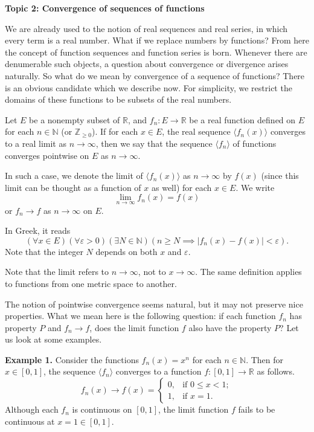\documentclass[11pt]{article}
\begin{document}
\begin{center}
  \textbf{Topic 2: Convergence of sequences of functions}
\end{center}

We are already used to the notion of real sequences and real series, in which every term is a real number.
What if we replace numbers by functions?
From here the concept of function sequences and function series is born.
Whenever there are denumerable such objects, a question about convergence or divergence arises naturally.
So what do we mean by convergence of a sequence of functions?
There is an obvious candidate which we describe now.
For simplicity, we restrict the domains of these functions to be subsets of the real numbers.

\begin{defn}
  Let $E$ be a nonempty subset of $\mathbb{R}$, and $f_n : E \to \mathbb{R}$ be a real function defined on $E$ for each $n \in \mathbb{N}$ (or $\mathbb{Z}_{\geqslant 0}$).
  If for each $x \in E$, the real sequence $\langle f_n(x)\rangle$ converges to a real limit as $n \to \infty$, then we say that the sequence $\langle f_n \rangle$ of functions \textsf{converges pointwise} on $E$ as $n \to \infty$.

  In such a case, we denote the limit of $\langle f_n(x) \rangle$ as $n \to \infty$ by $f(x)$ (since this limit can be thought as a function of $x$ as well) for each $x \in E$.  We write
  \[
    \lim_{n\to\infty} f_n(x) = f(x)
  \]
  or $f_n \rightarrow f$ as $n \to \infty$ on $E$.
\end{defn}

In Greek, it reads
\[
  (\forall x \in E)(\forall \varepsilon > 0)(\exists N \in \mathbb{N})(n \geqslant N \implies |f_n(x) - f(x)| < \varepsilon).
\]
Note that the integer $N$ depends on both $x$ and $\varepsilon$.

Note that the limit refers to $n \to \infty$, not to $x \to \infty$.
The same definition applies to functions from one metric space to another.

The notion of pointwise convergence seems natural, but it may not preserve nice properties.
What we mean here is the following question: if each function $f_n$ has property $P$ and $f_n \to f$, does the limit function $f$ also have the property $P$?
Let us look at some examples.

\noindent\textbf{Example 1.} Consider the functions $f_n(x) = x^n$ for each $n \in \mathbb{N}$.  Then for $x \in [0,1]$, the sequence $\langle f_n \rangle$ converges to a function $f: [0,1] \to \mathbb{R}$ as follows.
\[
  f_n(x) \to f(x) = 
  \begin{cases}
    0, & \text{if $0 \leqslant x < 1$}; \\
    1, & \text{if $x = 1$}.
  \end{cases}
\]
Although each $f_n$ is continuous on $[0,1]$, the limit function $f$ fails to be continuous at $x = 1 \in [0,1]$.
\end{document}
